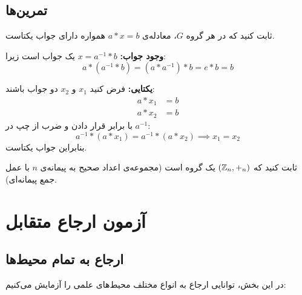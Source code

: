 \documentclass{matinbook}
\begin{document}
\section{تمرین‌ها}
\label{sec:grouptheory-exercises}

\begin{exercise}
    ثابت کنید که در هر گروه $G$، معادله‌ی $a * x = b$
    همواره دارای جواب یکتاست.
    \label{exc:group-equation}
\end{exercise}

\begin{solution}
    \textbf{وجود جواب:} $x = a^{-1} * b$ یک جواب است زیرا:
    \[
    a * (a^{-1} * b) = (a * a^{-1}) * b = e * b = b
    \]

    \textbf{یکتایی:} فرض کنید $x_{1}$ و $x_{2}$ دو جواب باشند:
    \begin{align*}
        a * x_{1} &= b \\
        a * x_{2} &= b
    \end{align*}
    با برابر قرار دادن و ضرب از چپ در $a^{-1}$:
    \[
    a^{-1} * (a * x_{1}) = a^{-1} * (a * x_{2})
    \implies x_{1} = x_{2}
    \]
    بنابراین جواب یکتاست.
\end{solution}

\begin{exercise}
    ثابت کنید که $(\mathbb{Z}_{n}, +_{n})$ یک گروه است (مجموعه‌ی
    اعداد صحیح به پیمانه‌ی $n$ با عمل جمع پیمانه‌ای).
    \label{exc:zn-group}
\end{exercise}

\chapter{آزمون ارجاع متقابل}
\label{chap:cref}

\section{ارجاع به تمام محیط‌ها}
\label{sec:cref-all}

در این بخش، توانایی ارجاع به انواع مختلف محیط‌های علمی
را آزمایش می‌کنیم:
\end{document}
